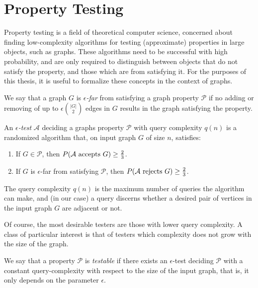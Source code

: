 \section{Property Testing} \label{sec:section_6}

    Property testing is a field of theoretical computer science, concerned about finding low-complexity algorithms
    for testing (approximate) properties in large objects, such as graphs.
    These algorithms need to be successful with high probability, and are only required to distinguish between objects
    that do not satisfy the property, and those which are  from satisfying it.
    For the purposes of this thesis, it is useful to formalize these concepts in the context of graphs.

    \begin{definition}
        We say that a graph $G$ is \emph{$\epsilon$-far} from satisfying a graph property $\mathcal{P}$ if no adding or
        removing of up to $\epsilon {|G| \choose 2}$ edges in $G$ results in the graph satisfying the property.
    \end{definition}

    \begin{definition} \label{def:epsilon_test}
        An \emph{$\epsilon$-test} $\mathcal{A}$ deciding a graphs property $\mathcal{P}$ with query complexity
        $q(n)$ is a randomized algorithm that, on input graph $G$ of size $n$,
        satisfies:
        \begin{enumerate}
            \item If $G \in \mathcal{P}$, then $P( \mathcal{A} \text{ accepts } G ) \geq \frac{2}{3}$.
            \item If $G$ is $\epsilon$-far from satisfying $\mathcal{P}$,
                then $P( \mathcal{A} \text{ rejects } G ) \geq \frac{2}{3}$.
        \end{enumerate}
        The query complexity $q(n)$ is the maximum number of queries the algorithm can make, and (in our case)
        a query discerns whether a desired pair of vertices in the input graph $G$ are adjacent or not.
    \end{definition}

    Of course, the most desirable testers are those with lower query complexity.
    A class of particular interest is that of testers which complexity does not grow with the size of the
    graph.

    \begin{definition}
        We say that a property $\mathcal{P}$ is \emph{testable} if there exists an $\epsilon$-test deciding $\mathcal{P}$
        with a constant query-complexity with respect to the size of the input graph, that is, it only depends on the
        parameter $\epsilon$.
    \end{definition}

